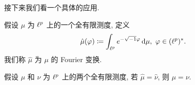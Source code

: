 接下来我们看一个具体的应用.
\begin{definition}[Fourier 变换]
假设 $\mu$ 为 $\ell^p$ 上的一个全有限测度, 定义
\[\hat{\mu}(\phi)\dy\int_{\lp} e^{-\xs\phi}\dd\mu,\ \phi\in\colp.\]
我们称 $\hat{\mu}$ 为 $\mu$ 的 Fourier 变换.
\end{definition}
\begin{corollary}
假设 $\mu$ 和 $\nu$ 为 $\ell^p$ 上的两个全有限测度, 若 $\hat{\mu}=\hat{\nu}$, 则 $\mu=\nu$.
\end{corollary}
